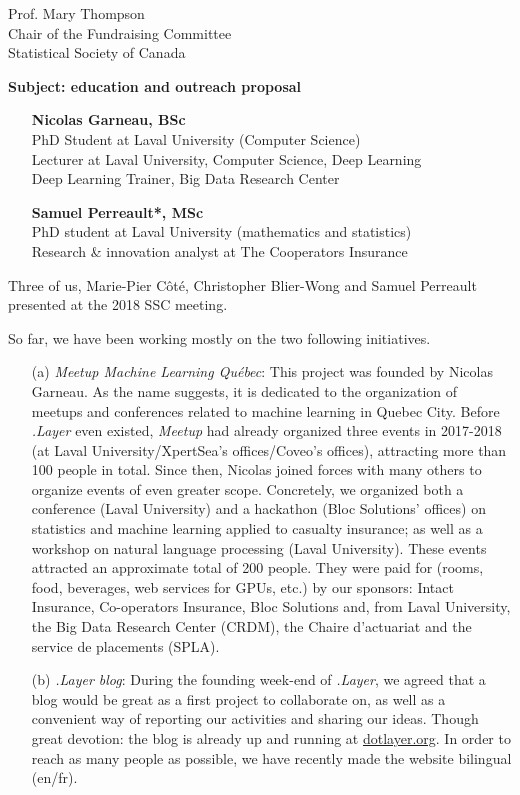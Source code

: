 \documentclass[11pt, a4paper]{letter} %
\begin{document}
\begin{letter}{
	Prof. Mary Thompson\\
	Chair of the Fundraising Committee\\
	Statistical Society of Canada
	
	\bigskip
	\textbf{Subject: education and outreach proposal}%
}
\begin{enumerate}
	\quad Teaching chair on big data analysis for actuarial science --- Intact\\
	\quad Member of the \emph{New Investigators Committee} of the \emph{SSC}
	\item[] \textbf{Nicolas Garneau, BSc}\\
	\quad PhD Student at Laval University (Computer Science)\\
	Lecturer at Laval University, Computer Science, Deep Learning\\
	Deep Learning Trainer, Big Data Research Center
	\item[] \textbf{Samuel Perreault*, MSc}\\
	\quad PhD student at Laval University (mathematics and statistics)\\
	\quad Research \& innovation analyst at The Cooperators Insurance
\end{enumerate}

\noindent Three of us, Marie-Pier Côté, Christopher Blier-Wong and Samuel Perreault presented at the 2018 SSC meeting.

\noindent So far, we have been working mostly on the two following initiatives.
\begin{enumerate}
	\item[(a)] \emph{Meetup Machine Learning Québec}: This project was founded by Nicolas Garneau. As the name suggests, it is dedicated to the organization of meetups and conferences related to machine learning in Quebec City. Before \emph{.Layer} even existed, \emph{Meetup} had already organized three events in 2017-2018 (at Laval University/XpertSea's offices/Coveo's offices), attracting more than 100 people in total. Since then, Nicolas joined forces with many others to organize events of even greater scope. Concretely, we organized both a conference (Laval University) and a hackathon (Bloc Solutions' offices) on statistics and machine learning applied to casualty insurance; as well as a workshop on natural language processing (Laval University). These events attracted an approximate total of 200 people. They were paid for (rooms, food, beverages, web services for GPUs, etc.) by our sponsors: Intact Insurance, Co-operators Insurance, Bloc Solutions and, from Laval University, the Big Data Research Center (CRDM), the Chaire d'actuariat and the service de placements (SPLA).
	\item[(b)] \emph{.Layer blog}: During the founding week-end of \emph{.Layer}, we agreed that a blog would be great as a first project to collaborate on, as well as a convenient way of reporting our activities and sharing our ideas. Though great devotion: the blog is already up and running at \href{https://www.dotlayer.org/}{dotlayer.org}. In order to reach as many people as possible, we have recently made the website bilingual (en/fr).
\end{enumerate}


\end{letter}
\end{document}
